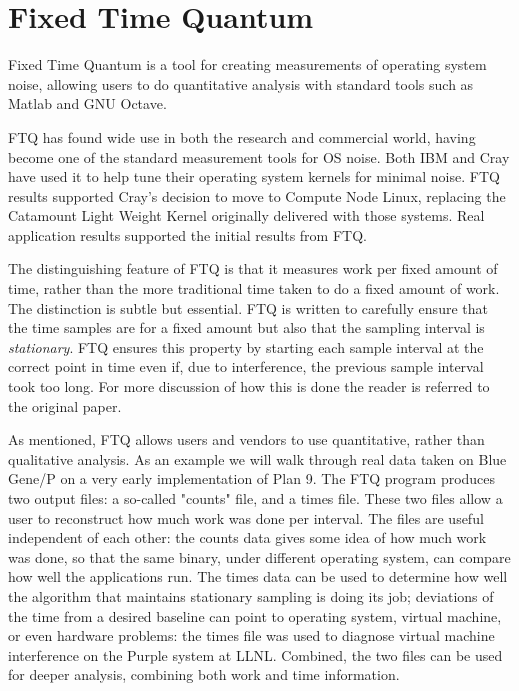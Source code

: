 \chapter{Fixed Time Quantum}

Fixed Time Quantum\cite{ftq} is a tool for creating measurements of operating system noise, allowing users to do quantitative analysis 
with
standard tools such as Matlab and GNU Octave.

FTQ has found wide use in both the research and commercial world, having become one of the standard measurement tools for OS noise. 
Both IBM and Cray have used it to help tune their operating system kernels for minimal noise. 
FTQ results supported Cray's decision to move to Compute Node Linux, replacing the Catamount Light Weight Kernel originally delivered with those systems. Real 
application results supported the initial results from FTQ. 

The distinguishing feature of FTQ is that it measures work per fixed amount of time, rather than the more traditional time taken to do a fixed amount of work. The distinction is subtle but essential.  FTQ is written to carefully ensure that the time samples are for a fixed amount but also that the sampling interval is {\em stationary}. FTQ ensures this property by starting each sample interval at the correct point in time even if, due to interference, the previous sample interval took too long. For more discussion of how this is done the reader is referred to the original paper. 

As mentioned, FTQ allows users and vendors to use quantitative, rather than qualitative analysis.  As an example we will walk through real data taken on 
Blue Gene/P on a very early implementation of Plan 9. 
The FTQ program produces two output files: a so-called "counts" file, and a times file. These two files allow a user to reconstruct how much work was done per interval. The files 
are useful independent of each other: the counts data gives some idea of how much work was done, so
that the same binary, under different operating system, can compare how well the applications run.
The times data can be used to determine how well the algorithm that maintains stationary sampling is
doing its job; deviations of the time from a desired baseline can point to operating system, virtual
machine,  or even hardware problems: the times file was used to diagnose virtual machine interference on the Purple system at LLNL. Combined, the two files can be used for deeper analysis, combining both work and time information. 

